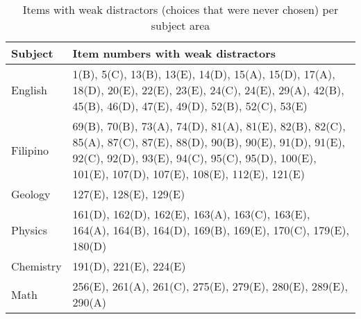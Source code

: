 \documentclass[10pt]{apa6}
\begin{document}
\begin{table}
\caption{\label{weakitems} Items with weak distractors (choices that were never chosen) per subject area}
\begin{tabular}{lp{}}
\toprule
Subject & Item numbers with weak distractors \\
\midrule
English & 1(B), 5(C), 13(B), 13(E), 14(D), 15(A), 15(D), 17(A), 18(D), 20(E), 22(E), 23(E), 24(C), 24(E), 29(A), 42(B), 45(B), 46(D), 47(E), 49(D), 52(B), 52(C), 53(E)\\
Filipino & 69(B), 70(B), 73(A), 74(D), 81(A), 81(E), 82(B), 82(C), 85(A), 87(C), 87(E), 88(D), 90(B), 90(E), 91(D), 91(E), 92(C), 92(D), 93(E), 94(C), 95(C), 95(D), 100(E), 101(E), 107(D), 107(E), 108(E), 112(E), 121(E)\\
Geology & 127(E), 128(E), 129(E)\\
Physics & 161(D), 162(D), 162(E), 163(A), 163(C), 163(E), 164(A), 164(B), 164(D), 169(B), 169(E), 170(C), 179(E), 180(D)\\
Chemistry & 191(D), 221(E), 224(E)\\
Math & 256(E), 261(A), 261(C), 275(E), 279(E), 280(E), 289(E), 290(A)\\
\bottomrule
\end{tabular}
\end{table}
\end{document}
